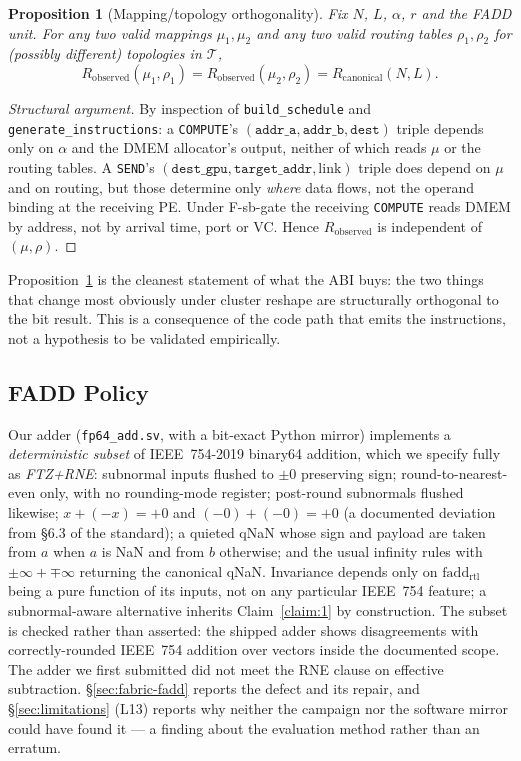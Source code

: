 \documentclass[journal,10pt]{IEEEtran}
\theoremstyle{plain}
\newtheorem{proposition}{Proposition}
\theoremstyle{definition}
\theoremstyle{remark}
\newenvironment{structuralargument}{\begin{proof}[Structural argument]}{\end{proof}}
\newcommand{\fadd}{\ensuremath{\mathrm{fadd}_{\mathrm{rtl}}}}
\newcommand{\Rcan}{\ensuremath{R_{\mathrm{canonical}}}}
\newcommand{\sv}[1]{\texttt{#1}}
\newcommand{\T}{\ensuremath{\mathcal{T}}}
\newcommand{\asgn}{\ensuremath{\alpha}}
\newcommand{\map}{\ensuremath{\mu}}
\begin{document}
\begin{proposition}[Mapping/topology orthogonality]\label{thm:orth}
Fix $N$, $L$, $\asgn$, $r$ and the FADD unit. For any two valid mappings
$\map_1,\map_2$ and any two valid routing tables $\rho_1,\rho_2$ for
(possibly different) topologies in $\T$,
\begin{equation}
  R_\mathrm{observed}(\map_1, \rho_1) = R_\mathrm{observed}(\map_2, \rho_2)
  = \Rcan(N, L).
\end{equation}
\end{proposition}

\begin{structuralargument}
By inspection of \sv{build\_schedule} and \sv{generate\_instructions}: a
\texttt{COMPUTE}'s $(\texttt{addr\_a},\texttt{addr\_b},\texttt{dest})$ triple
depends only on $\asgn$ and the DMEM allocator's output, neither of which
reads $\map$ or the routing tables. A \texttt{SEND}'s
$(\texttt{dest\_gpu},\texttt{target\_addr},\text{link})$ triple does depend on
$\map$ and on routing, but those determine only \emph{where} data flows, not
the operand binding at the receiving PE. Under \textsf{F-sb-gate} the
receiving \texttt{COMPUTE} reads DMEM by address, not by arrival time, port or
VC. Hence $R_\mathrm{observed}$ is independent of $(\map,\rho)$.
\end{structuralargument}

Proposition~\ref{thm:orth} is the cleanest statement of what the ABI buys: the
two things that change most obviously under cluster reshape are structurally
orthogonal to the bit result. This is a consequence of the code path that
emits the instructions, not a hypothesis to be validated empirically.

\subsection{FADD Policy}\label{sec:fadd}

Our adder (\sv{fp64\_add.sv}, with a bit-exact Python mirror) implements a
\emph{deterministic subset} of IEEE~754-2019 binary64 addition, which we
specify fully as \emph{FTZ+RNE}: subnormal inputs flushed to $\pm0$ preserving
sign; round-to-nearest-even only, with no rounding-mode register; post-round
subnormals flushed likewise; $x+(-x) = +0$ and $(-0)+(-0) = +0$ (a documented
deviation from \S6.3 of the standard); a quieted qNaN whose sign and payload
are taken from $a$ when $a$ is NaN and from $b$ otherwise; and the usual
infinity rules with $\pm\infty + \mp\infty$ returning the canonical qNaN.
Invariance depends only on $\fadd$ being a pure function of its inputs, not on
any particular IEEE~754 feature; a subnormal-aware alternative inherits
Claim~\ref{claim:1} by construction. The subset is checked rather than
asserted: the shipped adder shows \FpSweepErrors{} disagreements with
correctly-rounded IEEE~754 addition over \FpSweepVectors{} vectors inside the
documented scope. The adder we first submitted did not meet the RNE clause on
effective subtraction. \S\ref{sec:fabric-fadd} reports the defect and its
repair, and \S\ref{sec:limitations} (L13) reports why neither the campaign
nor the software mirror could have found it --- a finding about the
evaluation method rather than an erratum.
\end{document}
